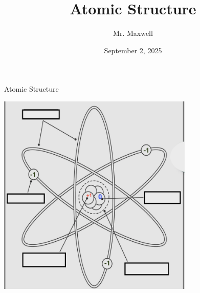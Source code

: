 \documentclass[presentation]{beamer}
\author{Mr. Maxwell}
\date{September 2, 2025}
\title{Atomic Structure}
\begin{document}
\maketitle


\begin{frame}[label={sec:org2f8a5a8}]{Atomic Structure}
\begin{center}
\includegraphics[width=0.7\textwidth]{./atomNotes.png}
\end{center}
\end{frame}
\end{document}
